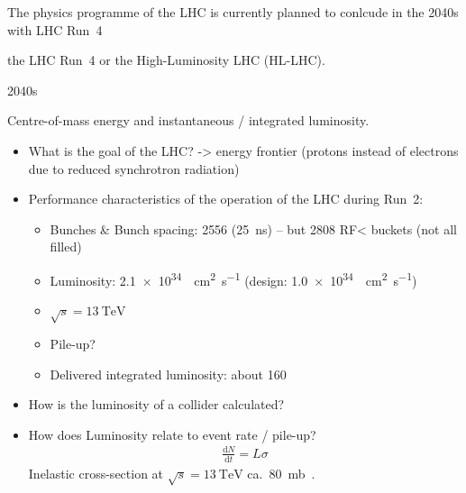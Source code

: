 The physics programme of the LHC is currently planned to conlcude in the 2040s
with LHC Run~4


the LHC Run~4 or the High-Luminosity LHC (HL-LHC).

2040s



Centre-of-mass energy and instantaneous / integrated luminosity.



\begin{itemize}

\item What is the goal of the LHC? -> energy frontier (protons instead of
  electrons due to reduced synchrotron radiation)

\item Performance characteristics of the \pp operation of the LHC during Run~2:

  \begin{itemize}
  \item Bunches \& Bunch spacing: 2556 (\SI{25}{\nano\second}) -- but 2808 RF<
    buckets (not all filled)
  \item Luminosity: \SI{2.1e34}{\per\centi\metre\squared\per\second} (design:
    \SI{1.0e34}{\per\centi\metre\squared\per\second})
  \item $\sqrt{s} = \SI{13}{\TeV}$
  \item Pile-up?
  \item Delivered integrated luminosity: about \SI{160}{\ifb}
    \end{itemize}

\item How is the luminosity of a collider calculated?

\item How does Luminosity relate to event rate / pile-up?
  \begin{align*}
    \frac{\mathrm{d}N}{\mathrm{d}t} = L \sigma
  \end{align*}
  Inelastic \pp cross-section at $\sqrt{s} = \SI{13}{\TeV}$ ca.\
  \SI{80}{\milli\barn}~\cite{STDM-2015-05}.

\end{itemize}

